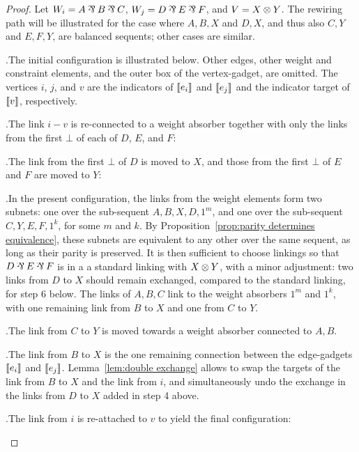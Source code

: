 \documentclass{lmcs}
\begin{document}
\renewcommand\scalefactor{0.80}

\newcommand\displayOcto[1]{%
   \medskip%
   \centerline{%
	 \scale{#1}%
  }%
  \medskip%
}


\begin{proof}
Let $W_i=A\parr B\parr C$, $W_j=D\parr E\parr F$, and $V=X\otimes Y$.
%
The rewiring path will be illustrated for the case where $A,B,X$ and $D,X$, and thus also $C,Y$ and $E,F,Y$, are balanced sequents; other cases are similar.


\pagebreak
{}.\quad The initial configuration is illustrated below.
%
Other edges, other weight and constraint elements, and the outer box of the vertex-gadget, are omitted.
%
The vertices $i$, $j$, and  $v$ are the indicators of $\llbracket e_i\rrbracket$ and $\llbracket e_j\rrbracket$ and the indicator target of $\llbracket v\rrbracket$, respectively.

\displayOcto{\octorollA1}


.\quad The link $i-v$ is re-connected to a weight absorber together with only the links from the first $\bot$ of each of $D$, $E$, and $F$:

\displayOcto{\octorollB2}


.\quad The link from the first $\bot$ of $D$ is moved to $X$, and those from the first $\bot$ of $E$ and $F$ are moved to $Y$:


\displayOcto{\octorollB3}


.\quad In the present configuration, the links from the weight elements form two subnets: one over the sub-sequent $A,B,X,D,1^m$, and one over the sub-sequent $C,Y,E,F,1^k$, for some $m$ and $k$.
%
By Proposition~\ref{prop:parity determines equivalence}, these subnets are equivalent to any other over the same sequent, as long as their parity is preserved.
%
It is then sufficient to choose linkings so that $D\parr E\parr F$ is in a a standard linking with $X\otimes Y$, with a minor adjustment: two links from $D$ to $X$ should remain exchanged, compared to the standard linking, for step 6 below.
%
The links of $A,B,C$ link to the weight absorbers $1^m$ and $1^k$, with one remaining link from $B$ to $X$ and one from $C$ to $Y$.


\displayOcto{\octorollC}

\newpage
{}.\quad The link from $C$ to $Y$ is moved towards a weight absorber connected to $A,B$.


\displayOcto{\octorollD1}


.\quad The link from $B$ to $X$ is the one remaining connection between the edge-gadgets $\llbracket e_i\rrbracket$ and $\llbracket e_j\rrbracket$.
%
Lemma~\ref{lem:double exchange} allows to swap the targets of the link from $B$ to $X$ and the link from $i$, and simultaneously undo the exchange in the links from $D$ to $X$ added in step 4 above.


\displayOcto{\octorollD2}


.\quad The link from $i$ is re-attached to $v$ to yield the final configuration:

\displayOcto{\octorollA2}
%
\end{proof}
\end{document}

